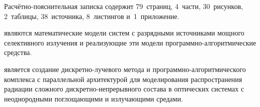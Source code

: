 

Расчётно-пояснительная записка содержит 79~страниц, 4~части, 30~рисунков, 2~таблицы, 38~источника, 8~листингов и~1~приложение.

 являются математические модели систем с разрядными источниками мощного селективного излучения и реализующие эти модели программно-алгоритмические средства.

 является создание дискретно-лучевого метода и программно-алгоритмического комплекса с параллельной архитектурой для моделирования распространения радиации сложного дискретно-непрерывного состава в оптических системах с неоднородными поглощающими и излучающими средами.


